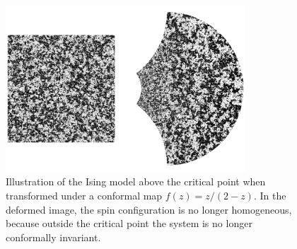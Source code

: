 \begin{figure}
\begin{center}
    \includegraphics[width=0.8\textwidth]{chapters/ch3-conf/figs/isingcm2}
\end{center}
\caption{Illustration of the Ising model above the critical point when
    transformed under a conformal map $f(z)=z/(2-z)$. In the deformed image,
    the spin configuration is no longer homogeneous, because outside the
    critical point the system is no longer conformally invariant.}
\label{fig:isingcm2}
\end{figure}

